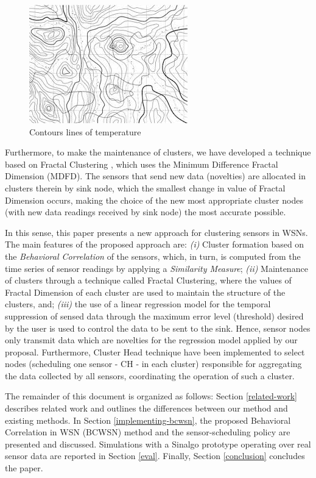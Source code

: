 \documentclass{acm_proc_article-sp}
\begin{document}
\begin{figure}[!htb]
\centering
	\includegraphics[scale=0.9]{I2.png}
    \caption{Contours lines of temperature}
    \label{fig:contour_lines}
\end{figure}

Furthermore, to make the maintenance of clusters, we have developed a technique
based on Fractal Clustering \cite{Barbara1999}, which uses the Minimum
Difference Fractal Dimension (MDFD). The sensors that send new data (novelties)
are allocated in clusters therein by sink node, which the smallest
change in value of Fractal Dimension occurs, making the choice of the new most
appropriate cluster nodes (with new data readings received by sink node) the
most accurate possible.

In this sense, this paper presents a new approach for clustering sensors in
WSNs. The main features of the proposed approach are: {\it (i)} Cluster
formation based on the \textit{Behavioral Correlation} of the sensors, which, in
turn, is computed from the time series of sensor readings by applying a
\textit{Similarity Measure}; {\it (ii)} Maintenance of clusters through a
technique called Fractal Clustering, where the values of Fractal Dimension of
each cluster are used to maintain the structure of the clusters, and; {\it
(iii)} the use of a linear regression model for the temporal suppression of
sensed data through the maximum error level (threshold) desired by the user is
used to control the data to be sent to the sink. Hence, sensor nodes
only transmit data which are novelties for the regression model applied by our
proposal. Furthermore, Cluster Head technique have been implemented to select
nodes (scheduling one sensor - CH - in each cluster) responsible for aggregating
the data collected by all sensors, coordinating the operation of such a cluster.


The remainder of this document is organized as follows: Section
\ref{related-work} describes related work and outlines the differences between
our method and existing methods. In Section \ref{implementing-bcwsn}, the
proposed Behavioral Correlation in WSN (BCWSN) method and the sensor-scheduling
policy are presented and discussed. Simulations with a Sinalgo prototype
operating over real sensor data are reported in Section \ref{eval}. Finally,
Section \ref{conclusion} concludes the paper.
\end{document}
